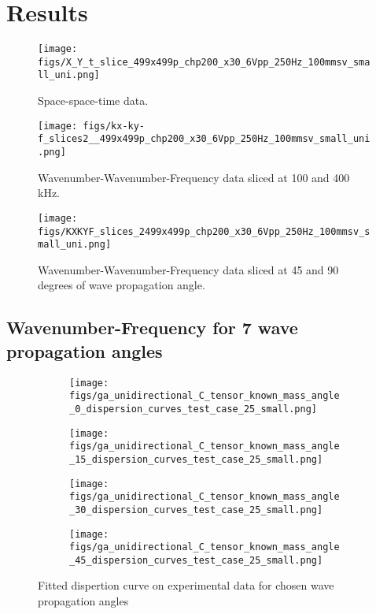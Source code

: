 \documentclass[runningheads]{llncs}
\begin{document}
\section{Results}

\begin{figure}
	\begin{center}
		\texttt{[image: figs/X\_Y\_t\_slice\_499x499p\_chp200\_x30\_6Vpp\_250Hz\_100mmsv\_small\_uni.png]}
	\end{center}
	\caption{Space-space-time data.}
	\label{fig2}
\end{figure}

\begin{figure}
	\begin{center}
		\texttt{[image: figs/kx-ky-f\_slices2\_\_499x499p\_chp200\_x30\_6Vpp\_250Hz\_100mmsv\_small\_uni.png]}
	\end{center}
	\caption{Wavenumber-Wavenumber-Frequency data sliced at 100 and 400 kHz.}
	\label{fig3}
\end{figure}

\begin{figure}
	\begin{center}
		\texttt{[image: figs/KXKYF\_slices\_2499x499p\_chp200\_x30\_6Vpp\_250Hz\_100mmsv\_small\_uni.png]}
	\end{center}
	\caption{Wavenumber-Wavenumber-Frequency data sliced at 45 and 90 degrees of wave propagation angle.}
	\label{fig4}
\end{figure}

\subsection{Wavenumber-Frequency for 7 wave propagation angles}

\begin{figure}[ht]
	\begin{subfigure}{.5\textwidth}
		\centering
		\texttt{[image: figs/ga\_unidirectional\_C\_tensor\_known\_mass\_angle\_0\_dispersion\_curves\_test\_case\_25\_small.png]}  
	\end{subfigure}
	\begin{subfigure}{.5\textwidth}
		\centering
		\texttt{[image: figs/ga\_unidirectional\_C\_tensor\_known\_mass\_angle\_15\_dispersion\_curves\_test\_case\_25\_small.png]}  
	\end{subfigure}
	\newline
	\begin{subfigure}{.5\textwidth}
		\centering
		\texttt{[image: figs/ga\_unidirectional\_C\_tensor\_known\_mass\_angle\_30\_dispersion\_curves\_test\_case\_25\_small.png]}  
	\end{subfigure}
	\begin{subfigure}{.5\textwidth}
		\centering
		\texttt{[image: figs/ga\_unidirectional\_C\_tensor\_known\_mass\_angle\_45\_dispersion\_curves\_test\_case\_25\_small.png]}  
	\end{subfigure}
	\caption{Fitted dispertion curve on experimental data for chosen wave propagation angles}
	\label{fig7}
\end{figure}
\end{document}
